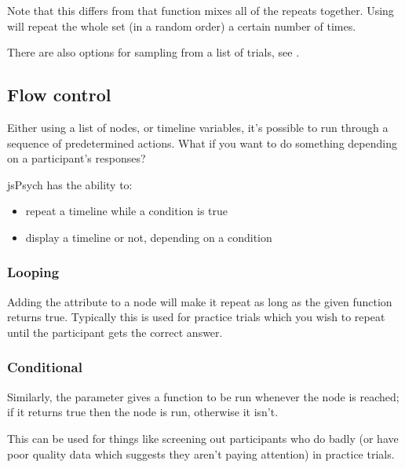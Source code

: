 \documentclass[letterpaper,10pt,english]{sphinxmanual}
\begin{document}
Note that this differs from  \textendash{} that function
mixes all of the repeats together. Using  will repeat the whole
set (in a random order) a certain number of times.

There are also options for sampling from a list of trials, see
 .


\subsection{Flow control}
\label{\detokenize{jspsych_au:flow-control}}
Either using a list of nodes, or timeline variables, it’s possible
to run through a sequence of predetermined actions. What if you want to do
something depending on a participant’s responses?

jsPsych has the ability to:
\begin{itemize}
\item {} 
repeat a timeline while a condition is true

\item {} 
display a timeline or not, depending on a condition

\end{itemize}


\subsubsection{Looping}
\label{\detokenize{jspsych_au:looping}}
Adding the  attribute to a node will make it repeat
as long as the given function returns true. Typically this is used for
practice trials which you wish to repeat until the participant gets the correct
answer.


\subsubsection{Conditional}
\label{\detokenize{jspsych_au:conditional}}
Similarly, the  parameter gives a function to be run
whenever the node is reached; if it returns true then the node is run,
otherwise it isn’t.

This can be used for things like screening out participants who do badly (or
have poor quality data which suggests they aren’t paying attention) in
practice trials.
\end{document}

